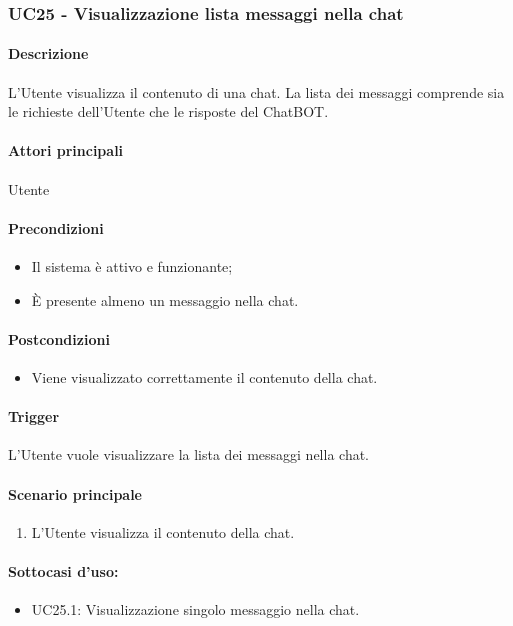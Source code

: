 \subsubsection{UC25 - Visualizzazione lista messaggi nella chat}\label{UC25}
\paragraph*{Descrizione}
L'Utente visualizza il contenuto di una chat. La lista dei messaggi comprende sia le richieste dell'Utente che le risposte del ChatBOT.

\paragraph*{Attori principali}
Utente

\paragraph*{Precondizioni}
\begin{itemize}
  \item Il sistema è attivo e funzionante;
  \item È presente almeno un messaggio nella chat.
\end{itemize}

\paragraph*{Postcondizioni}
\begin{itemize}
  \item Viene visualizzato correttamente il contenuto della chat.
\end{itemize}

\paragraph*{Trigger}
L'Utente vuole visualizzare la lista dei messaggi nella chat.

\paragraph*{Scenario principale}
\begin{enumerate}
  \item L'Utente visualizza il contenuto della chat.
\end{enumerate}

\paragraph*{Sottocasi d'uso:}
\begin{itemize}
  \item UC25.1: Visualizzazione singolo messaggio nella chat.
\end{itemize}

